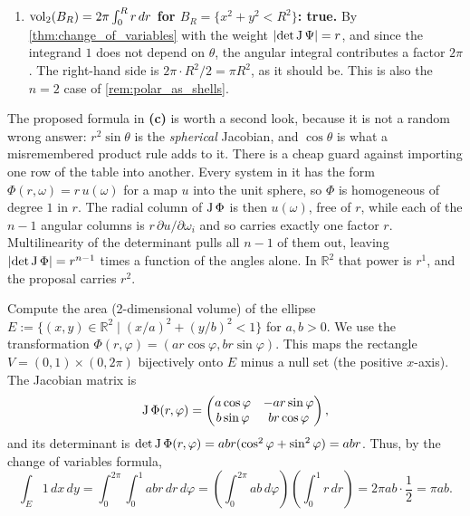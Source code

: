 \begin{example}
\begin{enumerate}[label=\textbf{(\alph*)}]
  \item \textbf{$\operatorname{vol}_2(B_R) = 2\pi\int_0^R r\,dr$ for $B_R = \{x^2+y^2 < R^2\}$: true.} By
    \cref{thm:change_of_variables} with the weight $\lvert\det\operatorname{J}\Psi\rvert = r$, and since the
    integrand $1$ does not depend on $\theta$, the angular integral contributes a factor $2\pi$.
    The right-hand side is $2\pi\cdot R^2/2 = \pi R^2$, as it should be. This is also the $n=2$
    case of \cref{rem:polar_as_shells}.
\end{enumerate}
The proposed formula in \textbf{(c)} is worth a second look, because it is not a random wrong
answer: $r^2\sin\theta$ is the \emph{spherical} Jacobian, and $\cos\theta$ is what a misremembered
product rule adds to it. There is a cheap guard against importing one row of the table into
another. Every system in it has the form $\Phi(r,\omega) = r\,u(\omega)$ for a map $u$ into the
unit sphere, so $\Phi$ is homogeneous of degree $1$ in $r$. The radial column of $\operatorname{J}\Phi$ is then
$u(\omega)$, free of $r$, while each of the $n-1$ angular columns is $r\,\partial u/\partial\omega_i$
and so carries exactly one factor $r$. Multilinearity of the determinant pulls all $n-1$ of them
out, leaving $\lvert\det\operatorname{J}\Phi\rvert = r^{n-1}$ times a function of the angles alone. In
$\mathbb{R}^2$ that power is $r^1$, and the proposal carries $r^2$.
\end{example}

\begin{example}
\label{ex:volume_ellipse}
Compute the area (2-dimensional volume) of the ellipse $E := \{(x,y) \in \mathbb{R}^2 \mid (x/a)^2 + (y/b)^2 < 1\}$ for $a,b > 0$.
We use the transformation $\Phi(r,\varphi) = (ar\cos\varphi, br\sin\varphi)$. This maps the rectangle $V = (0,1) \times (0,2\pi)$ bijectively onto $E$ minus a null set (the positive $x$-axis).
The Jacobian matrix is
\[\operatorname{J}\Phi(r,\varphi) = \begin{pmatrix} a\cos\varphi & -ar\sin\varphi \\ b\sin\varphi & br\cos\varphi \end{pmatrix},\]
and its determinant is $\det\operatorname{J}\Phi(r,\varphi) = abr(\cos^2\varphi + \sin^2\varphi) = abr$.
Thus, by the change of variables formula,
\[\int_E 1 \,dx\,dy = \int_0^{2\pi} \int_0^1 abr \,dr\,d\varphi = \left(\int_0^{2\pi} ab \,d\varphi\right) \left(\int_0^1 r \,dr\right) = 2\pi ab \cdot \frac{1}{2} = \pi ab.\]
\end{example}

